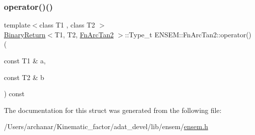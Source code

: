 \mbox{\label{structENSEM_1_1FnArcTan2_a85fa496fe2e31b3576d34560143f5b8f}} 
\subsubsection{\texorpdfstring{operator()()}{operator()()}\hspace{0.1cm}{\footnotesize\ttfamily [2/2]}}
{\footnotesize\ttfamily template$<$class T1 , class T2 $>$ \\
\mbox{\hyperlink{structENSEM_1_1BinaryReturn}{Binary\+Return}}$<$T1, T2, \mbox{\hyperlink{structENSEM_1_1FnArcTan2}{Fn\+Arc\+Tan2}} $>$\+::Type\+\_\+t E\+N\+S\+E\+M\+::\+Fn\+Arc\+Tan2\+::operator() (\begin{DoxyParamCaption}\item[{const T1 \&}]{a,  }\item[{const T2 \&}]{b }\end{DoxyParamCaption}) const\hspace{0.3cm}{\ttfamily [inline]}}



The documentation for this struct was generated from the following file\+:\begin{DoxyCompactItemize}
\item 
/\+Users/archanar/\+Kinematic\+\_\+factor/adat\+\_\+devel/lib/ensem/\mbox{\hyperlink{lib_2ensem_2ensem_8h}{ensem.\+h}}\end{DoxyCompactItemize}
